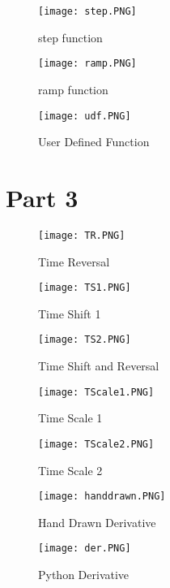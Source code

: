 \begin{figure}[H]
	\centering
	\texttt{[image: step.PNG]}
	\caption{step function}
\end{figure}

\begin{figure}[H]
	\centering
	\texttt{[image: ramp.PNG]}
	\caption{ramp function}
\end{figure}

\begin{figure}[H]
	\centering
	\texttt{[image: udf.PNG]}
	\caption{User Defined Function}
\end{figure}

\section{Part 3}

\begin{figure}[H]
	\centering
	\texttt{[image: TR.PNG]}
	\caption{Time Reversal}
\end{figure}

\begin{figure}[H]
	\centering
	\texttt{[image: TS1.PNG]}
	\caption{Time Shift 1}
\end{figure}

\begin{figure}[H]
	\centering
	\texttt{[image: TS2.PNG]}
	\caption{Time Shift and Reversal}
\end{figure}

\begin{figure}[H]
	\centering
	\texttt{[image: TScale1.PNG]}
	\caption{Time Scale 1}
\end{figure}

\begin{figure}[H]
	\centering
	\texttt{[image: TScale2.PNG]}
	\caption{Time Scale 2}
\end{figure}

\begin{figure}[H]
	\centering
	\texttt{[image: handdrawn.PNG]}
	\caption{Hand Drawn Derivative}
\end{figure}

\begin{figure}[H]
	\centering
	\texttt{[image: der.PNG]}
	\caption{Python Derivative}
\end{figure}

